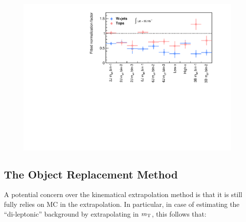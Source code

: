 %
%


\begin{figure}[h]
  \begin{center}
    \includegraphics[width=160mm]{figures/BGestimation/fittedSFs/SFs.pdf}
    \label{fig::BGestimation::fittedSFs}
  \end{center}
\end{figure}

\clearpage


\clearpage


\clearpage
\subsection{The Object Replacement Method} \label{sec::BGestimation::objRep}
A potential concern over the kinematical extrapolation method is that it is still fully relies on MC in the extrapolation. In particular, in case of estimating the ``di-leptonic'' background by extrapolating in $m_{\mathrm{T}}$, this follows that:

